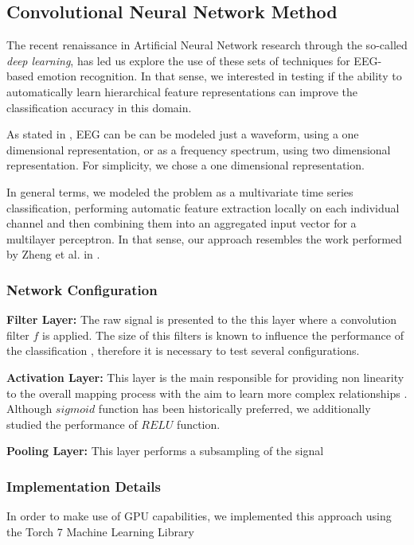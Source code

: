 \documentclass{sig-alternate}
\begin{document}
\subsection{Convolutional Neural Network Method}

The recent renaissance in Artificial Neural Network research 
through the so-called \emph{deep learning}, has led us explore 
the use of these sets of techniques for EEG-based emotion 
recognition. In that sense, we interested in testing if the ability
to automatically learn  hierarchical feature representations can
improve the classification accuracy in this domain. 

As stated in \cite{stober2014using}, EEG can be can be modeled 
just a waveform, using a one
dimensional representation, or as a frequency spectrum, using 
two dimensional representation. For simplicity, we chose a one
dimensional representation. 

In general terms, we modeled the problem as a multivariate time
 series classification, performing automatic feature extraction 
 locally on each individual channel and then combining them into
  an aggregated input vector for a multilayer perceptron. In that 
  sense, our approach resembles the work performed by Zheng et
  al. in \cite{zheng2014time}.
  
\subsubsection{Network Configuration}

\textbf{Filter Layer:}  The raw signal is presented to the this layer where a 
convolution filter  $f$ is applied. The size of this filters is known to influence 
the performance of the classification \cite{lecun1995convolutional}, therefore it is necessary to test several 
configurations.

\textbf{Activation Layer:} This layer is the main responsible for providing non linearity
to the overall mapping process with the aim to learn more complex relationships
\cite{xing2010brief}.  
Although $sigmoid$ function has been historically preferred, we additionally
 studied the performance of  $RE LU$ function.
 
\textbf{Pooling Layer: } This layer performs a subsampling of the signal 



\subsubsection{Implementation Details}
In order to make use of GPU capabilities, we implemented this approach
using the Torch 7 Machine Learning Library \cite{collobert2011torch7}
\end{document}
